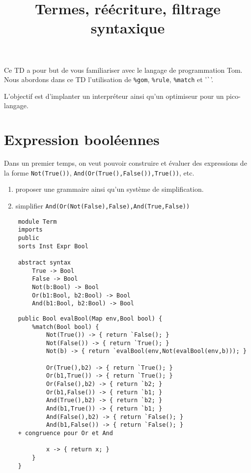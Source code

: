 \documentclass[11pt]{article}
\title{Termes, réécriture, filtrage syntaxique}
\begin{document}
\maketitle

Ce TD a pour but de vous familiariser avec le langage de programmation Tom.
Nous abordons dans ce TD l'utilisation de \verb|%gom|, \verb|%rule|, \verb|%match| et '\verb|`|'.

L'objectif est d'implanter un interpréteur ainsi qu'un optimiseur pour un pico-langage.

\section{Expression booléennes}
Dans un premier temps, on veut pouvoir construire et évaluer des expressions de la forme \verb|Not(True())|, \verb|And(Or(True(),False()),True())|, etc.

\begin{enumerate}
\item proposer une grammaire ainsi qu'un système de simplification.
\item simplifier \texttt{And(Or(Not(False),False),And(True,False))}
\end{enumerate}

\begin{versionProf}
\begin{verbatim}
    module Term
    imports 
    public
    sorts Inst Expr Bool
      
    abstract syntax
		True -> Bool
		False -> Bool
		Not(b:Bool) -> Bool
		Or(b1:Bool, b2:Bool) -> Bool
		And(b1:Bool, b2:Bool) -> Bool
\end{verbatim}

\begin{verbatim}
	public Bool evalBool(Map env,Bool bool) {
		%match(Bool bool) {	
			Not(True()) -> { return `False(); }
			Not(False()) -> { return `True(); }
			Not(b) -> { return `evalBool(env,Not(evalBool(env,b))); }

			Or(True(),b2) -> { return `True(); }
			Or(b1,True()) -> { return `True(); }
			Or(False(),b2) -> { return `b2; }
			Or(b1,False()) -> { return `b1; }
			And(True(),b2) -> { return `b2; }
			And(b1,True()) -> { return `b1; }
			And(False(),b2) -> { return `False(); }
			And(b1,False()) -> { return `False(); }
    + congruence pour Or et And

			x -> { return x; }
		}
	}

\end{verbatim}
\end{versionProf}
\end{document}
